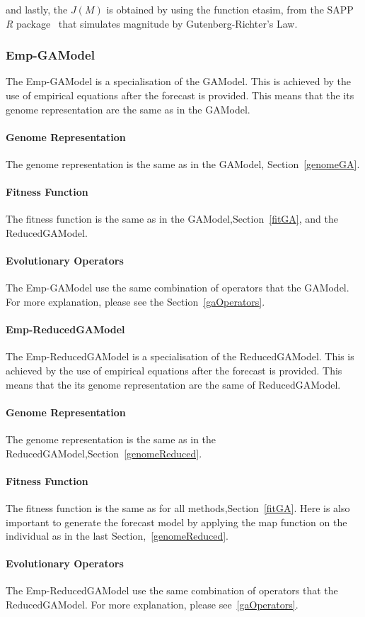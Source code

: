 and lastly, the $J(M)$ is obtained by using the function etasim, from the SAPP \textit{R} package~\cite{webSapp} that simulates magnitude by Gutenberg-Richter’s Law.


\subsubsection{Emp-GAModel}\label{emp-gamodel}
The Emp-GAModel is a specialisation of the GAModel. This is achieved by the use of empirical equations after the forecast is provided. This means that the its genome representation are the same as in the GAModel.
\paragraph{Genome Representation}
The genome representation is the same as in the GAModel, Section~\ref{genomeGA}.

\paragraph{Fitness Function}
The fitness function is the same as in the GAModel,Section~\ref{fitGA}, and the ReducedGAModel.
\paragraph{Evolutionary Operators}
The Emp-GAModel use the same combination of operators that the GAModel. For more explanation, please see the Section~\ref{gaOperators}.

\paragraph{Emp-ReducedGAModel}\label{emp-reducedgamodel}
The Emp-ReducedGAModel is a specialisation of the ReducedGAModel. This is achieved by the use of empirical equations after the forecast is provided. This means that the its genome representation are the same of ReducedGAModel.

\paragraph{Genome Representation}
The genome representation is the same as in the ReducedGAModel,Section~\ref{genomeReduced}. 

\paragraph{Fitness Function}
The fitness function is the same as for all methods,Section~\ref{fitGA}. Here is also important to generate the forecast model by applying the map function on the individual as in the last Section,~\ref{genomeReduced}.

\paragraph{Evolutionary Operators}
The Emp-ReducedGAModel use the same combination of operators that the ReducedGAModel. For more explanation, please see~\ref{gaOperators}.


